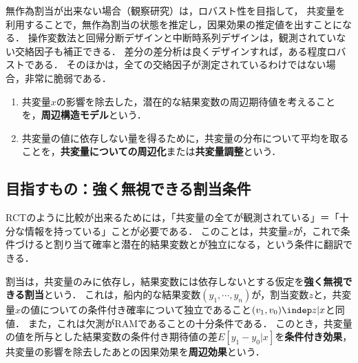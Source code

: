 \documentclass[uplatex,dvipdfmx]{jsreport}
\begin{document}
\begin{tcolorbox}[colframe=ForestGreen, colback=ForestGreen!10!white,breakable,colbacktitle=ForestGreen!40!white,coltitle=black,fonttitle=\bfseries\sffamily,
title=]
    無作為割当が出来ない場合（観察研究）は，ロバスト性を目指して，
    共変量を利用することで，無作為割当の状態を推定し，因果効果の推定値を出すことになる．
    操作変数法と回帰分断デザインと中断時系列デザインは，観測されていない交絡因子も補正できる．
    差分の差分析は良くデザインすれば，ある程度ロバストである．
    そのほかは，全ての交絡因子が測定されているわけではない場合，非常に脆弱である．
\end{tcolorbox}

\begin{definition}\mbox{}
    \begin{enumerate}
        \item 共変量$x$の影響を除去した，潜在的な結果変数の周辺期待値を考えることを，\textbf{周辺構造モデル}という．
        \item 共変量の値に依存しない量を得るために，共変量の分布について平均を取ることを，\textbf{共変量についての周辺化}または\textbf{共変量調整}という．
    \end{enumerate}
\end{definition}

\subsection{目指すもの：強く無視できる割当条件}

\begin{tcolorbox}[colframe=ForestGreen, colback=ForestGreen!10!white,breakable,colbacktitle=ForestGreen!40!white,coltitle=black,fonttitle=\bfseries\sffamily,
title=]
    RCTのように比較が出来るためには，「共変量の全てが観測されている」＝「十分な情報を持っている」ことが必要である．
    このことは，共変量$x$が，これで条件づけると割り当て確率と潜在的結果変数とが独立になる，という条件に翻訳できる．
\end{tcolorbox}

\begin{axiom}
    割当は，共変量のみに依存し，結果変数には依存しないとする仮定を\textbf{強く無視できる割当}という．
    これは，船内的な結果変数$(y_1,\cdots,y_n)$が，割当変数$z$と，共変量$x$の値についての条件付き確率について独立であること$(v_1,v_0)\indep z|x$と同値．
    また，これは欠測がRAMであることの十分条件である．
    このとき，共変量の値を所与とした結果変数の条件付き期待値の差$E[y_1-y_0|x]$を\textbf{条件付き効果}，共変量の影響を除去したあとの因果効果を\textbf{周辺効果}という．
\end{axiom}
\end{document}

